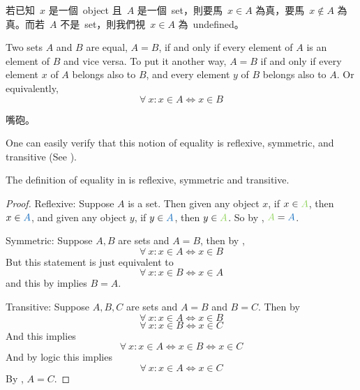 \begin{note}
若已知\ \(x\) 是一個\ object 且\ \(A\) 是一個\ set，則要馬\ \(x \in A\) 為真，要馬\ \(x \notin A\) 為真。而若\ \(A\) 不是\ set，則我們視\ \(x \in A\) 為\ undefined。
\end{note}

\begin{definition} \label{def 3.1.4} 
Two sets \(A\) and \(B\) are equal, \(A = B\), if and only if every element of \(A\) is an element of \(B\) and vice versa. To put it another way, \(A = B\) if and only if every element \(x\) of \(A\) belongs also to \(B\), and every element \(y\) of \(B\) belongs also to \(A\). Or equivalently,
\[
  \forall\ x : x \in A \iff x \in B
\]
\end{definition}

\begin{example}
嘴砲。
\end{example}

\begin{note}
One can easily verify that this notion of equality is reflexive, symmetric, and transitive (See ).
\end{note}

\begin{additional corollary}\label{ac 3.1.1}
The definition of equality in  is reflexive, symmetric and transitive.
\end{additional corollary}

\begin{proof}

Reflexive: Suppose \(A\) is a set. Then given any object \(x\), if \(x \in \GREEN{A}\), then \(x \in \BLUE{A}\), and given any object \(y\), if \(y \in \BLUE{A}\), then \(y \in \GREEN{A}\). So by , \(\GREEN{A} = \BLUE{A}\).

Symmetric: Suppose \(A, B\) are sets and \(A = B\), then by ,
\[
  \forall\ x : x \in A \iff x \in B
\]
But this statement is just equivalent to
\[
  \forall\ x : x \in B \iff x \in A
\]
and this by  implies \(B = A\).

Transitive: Suppose \(A, B, C\) are sets and \(A = B\) and \(B = C\). Then by 
\[
  \forall\ x : x \in A \iff x \in B
\]
\[
  \forall\ x : x \in B \iff x \in C
\]
And this implies
\[
  \forall\ x : x \in A \iff x \in B \iff x \in C
\]
And by logic this implies
\[
  \forall\ x : x \in A \iff x \in C
\]
By , \(A = C\).
\end{proof}


